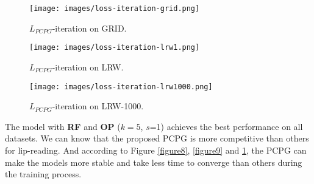 \documentclass{bmvc2k}
\begin{document}
	\begin{figure}[H]
		\vspace{-0.55cm}  %
		\setlength{\abovecaptionskip}{-0.0cm}   %
		\setlength{\belowcaptionskip}{-0.4cm} 
		\centering
		\begin{minipage}[t]{0.320\textwidth}
			
			\centering
			\texttt{[image: images/loss-iteration-grid.png]}
			\caption{$L_{PCPG}$-iteration on GRID.} \label{figure8}
		\end{minipage}
		\begin{minipage}[t]{0.320\textwidth}
			\centering
			\texttt{[image: images/loss-iteration-lrw1.png]}
			\caption{$L_{PCPG}$-iteration on LRW.} \label{figure9}
		\end{minipage}
			\begin{minipage}[t]{0.320\textwidth}
				\centering
				\texttt{[image: images/loss-iteration-lrw1000.png]}
				\caption{$L_{PCPG}$-iteration on LRW-1000.} \label{figure10}
		\end{minipage}
	\end{figure}
The model with \textbf{RF} and \textbf{OP} ($k=5$, $s$=1) achieves the best performance on all datasets. We can know that the proposed PCPG is more competitive than others for lip-reading. And according to Figure \ref{figure8}, \ref{figure9} and \ref{figure10}, the PCPG can make the models more stable and take less time to converge than others during the training process. 
	\vspace{-0.4cm} 
\end{document}

